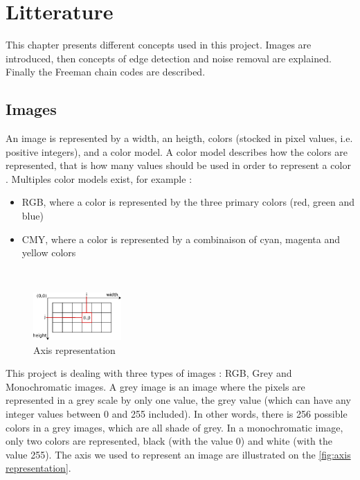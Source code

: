 \chapter{Litterature}

This chapter presents different concepts used in this project. Images are introduced, then concepts of edge detection and noise removal are explained. Finally the Freeman chain codes are described. 

\section{Images}

An image is represented by a width, an heigth, colors (stocked in pixel values, i.e. positive integers), and a color model. A color model describes how the colors are represented, that is how many values should be used in order to represent a color \cite{bib:image:ColorModel}. Multiples color models exist, for example : 
\begin{itemize}
	\item RGB, where a color is represented by the three primary colors (red, green and blue)
	\item CMY, where a color is represented by a combinaison of cyan, magenta and yellow colors
\end{itemize}


~~

\begin{figure}
	\centering
	\includegraphics[width=0.3\textwidth]{images/axis/axis_representation}
	\caption{Axis representation}
	\label{fig:axis representation}
\end{figure}


This project is dealing with three types of images : RGB, Grey and Monochromatic images. A grey image is an image where the pixels are represented in a grey scale by only one value, the grey value (which can have any integer values between 0 and 255 included). In other words, there is 256 possible colors in a grey images, which are all shade of grey. In a monochromatic image, only two colors are represented, black (with the value 0) and white (with the value 255). The axis we used to represent an image are illustrated on the \vref{fig:axis representation}. 

